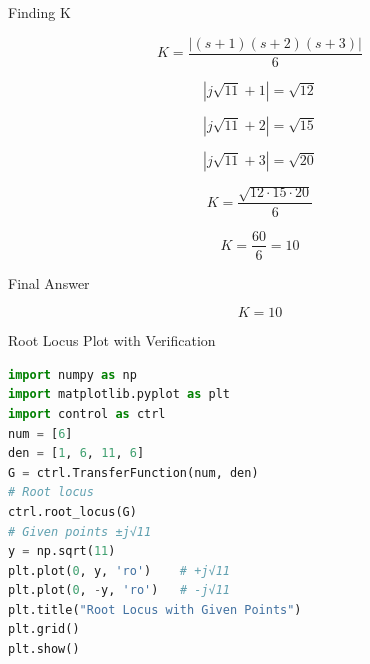 \documentclass{beamer}
\begin{document}

\begin{frame}{Finding K}

\begin{equation}
K = \frac{|(s+1)(s+2)(s+3)|}{6}
\end{equation}

\begin{equation}
|j\sqrt{11} + 1| = \sqrt{12}
\end{equation}

\begin{equation}
|j\sqrt{11} + 2| = \sqrt{15}
\end{equation}

\begin{equation}
|j\sqrt{11} + 3| = \sqrt{20}
\end{equation}

\begin{equation}
K = \frac{\sqrt{12 \cdot 15 \cdot 20}}{6}
\end{equation}

\begin{equation}
K = \frac{60}{6} = 10
\end{equation}

\end{frame}


\begin{frame}{Final Answer}

\begin{equation}
\boxed{K = 10}
\end{equation}

\vspace{0.4cm}



\end{frame}


 



 

\begin{frame}[fragile]{Root Locus Plot with Verification}

\begin{lstlisting}[language=Python]
import numpy as np
import matplotlib.pyplot as plt
import control as ctrl
num = [6]
den = [1, 6, 11, 6]
G = ctrl.TransferFunction(num, den)
# Root locus
ctrl.root_locus(G)
# Given points ±j√11
y = np.sqrt(11)
plt.plot(0, y, 'ro')    # +j√11
plt.plot(0, -y, 'ro')   # -j√11
plt.title("Root Locus with Given Points")
plt.grid()
plt.show()
\end{lstlisting}

\end{frame}
\end{document}
